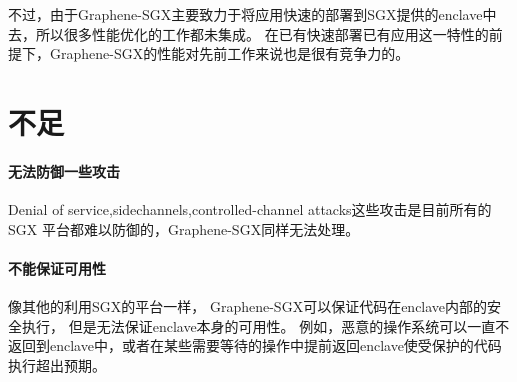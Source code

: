 不过，由于Graphene-SGX主要致力于将应用快速的部署到SGX提供的enclave中去，所以很多性能优化的工作都未集成。
在已有快速部署已有应用这一特性的前提下，Graphene-SGX的性能对先前工作来说也是很有竞争力的。


\section{不足}
\paragraph{无法防御一些攻击}
Denial of service,sidechannels,controlled-channel attacks这些攻击是目前所有的 SGX 平台都难以防御的，Graphene-SGX同样无法处理。
\paragraph{不能保证可用性}
像其他的利用SGX的平台一样，
Graphene-SGX可以保证代码在enclave内部的安全执行，
但是无法保证enclave本身的可用性。
例如，恶意的操作系统可以一直不返回到enclave中，或者在某些需要等待的操作中提前返回enclave使受保护的代码执行超出预期。




